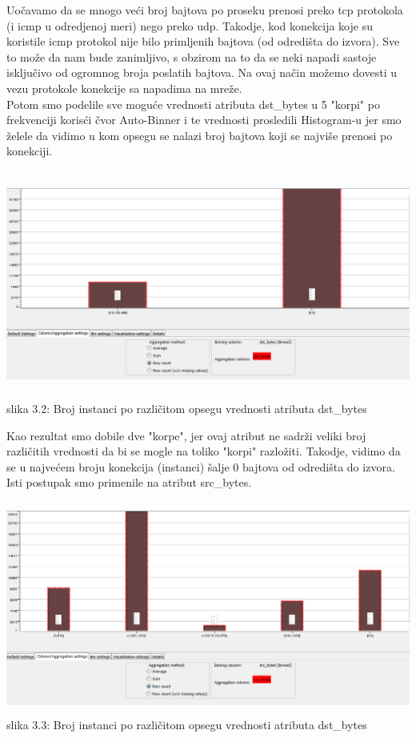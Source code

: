 \documentclass[10pt]{article}
\begin{document}
Uo\v cavamo da se mnogo ve\' ci broj bajtova po proseku prenosi preko tcp protokola (i icmp u odredjenoj meri) nego preko udp. Takodje, kod konekcija koje su koristile icmp protokol nije bilo primljenih bajtova (od odredi\v sta do izvora). Sve to mo\v ze da nam bude zanimljivo, s obzirom na to da se neki napadi sastoje isklju\v civo od ogromnog broja poslatih bajtova. Na ovaj na\v cin mo\v zemo dovesti u vezu protokole konekcije sa napadima na mre\v ze.\\
Potom smo podelile sve mogu\' ce vrednosti atributa dst\_bytes u 5 "korpi" po frekvenciji koris\' ci \v cvor Auto-Binner i te vrednosti prosledili Histogram-u jer smo \v zelele da vidimo u kom opsegu se nalazi broj bajtova koji se najvi\v se prenosi po konekciji.

\begin{center}
\includegraphics[width = \textwidth,  height = 7.5cm]{vizuelizacija2_dst}
slika 3.2: Broj instanci po razli\v citom opsegu vrednosti atributa dst\_bytes\\
\end{center}

Kao rezultat smo dobile dve "korpe", jer ovaj atribut ne sadr\v zi veliki broj razli\v citih vrednosti da bi se mogle na toliko "korpi" razlo\v ziti. Takodje, vidimo da se u najve\' cem broju konekcija (instanci) \v salje 0 bajtova od odredi\v sta do izvora.
Isti postupak smo primenile na atribut src\_bytes.

\begin{center}
\includegraphics[width = \textwidth,  height = 7cm]{vizuelizacija3_src}
slika 3.3: Broj instanci po razli\v citom opsegu vrednosti atributa dst\_bytes\\
\end{center}
\end{document}
